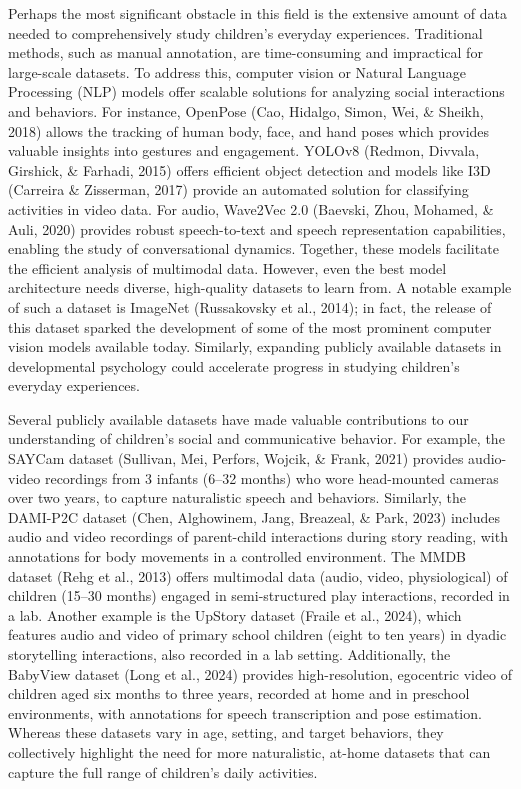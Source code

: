 \documentclass[
  man,floatsintext]{apa6}
\begin{document}
Perhaps the most significant obstacle in this field is the extensive amount of data needed to comprehensively study children's everyday experiences. Traditional methods, such as manual annotation, are time-consuming and impractical for large-scale datasets. To address this, computer vision or Natural Language Processing (NLP) models offer scalable solutions for analyzing social interactions and behaviors. For instance, OpenPose (Cao, Hidalgo, Simon, Wei, \& Sheikh, 2018) allows the tracking of human body, face, and hand poses which provides valuable insights into gestures and engagement. YOLOv8 (Redmon, Divvala, Girshick, \& Farhadi, 2015) offers efficient object detection and models like I3D (Carreira \& Zisserman, 2017) provide an automated solution for classifying activities in video data. For audio, Wave2Vec 2.0 (Baevski, Zhou, Mohamed, \& Auli, 2020) provides robust speech-to-text and speech representation capabilities, enabling the study of conversational dynamics. Together, these models facilitate the efficient analysis of multimodal data. However, even the best model architecture needs diverse, high-quality datasets to learn from. A notable example of such a dataset is ImageNet (Russakovsky et al., 2014); in fact, the release of this dataset sparked the development of some of the most prominent computer vision models available today. Similarly, expanding publicly available datasets in developmental psychology could accelerate progress in studying children's everyday experiences.

Several publicly available datasets have made valuable contributions to our understanding of children's social and communicative behavior. For example, the SAYCam dataset (Sullivan, Mei, Perfors, Wojcik, \& Frank, 2021) provides audio-video recordings from 3 infants (6--32 months) who wore head-mounted cameras over two years, to capture naturalistic speech and behaviors. Similarly, the DAMI-P2C dataset (Chen, Alghowinem, Jang, Breazeal, \& Park, 2023) includes audio and video recordings of parent-child interactions during story reading, with annotations for body movements in a controlled environment. The MMDB dataset (Rehg et al., 2013) offers multimodal data (audio, video, physiological) of children (15--30 months) engaged in semi-structured play interactions, recorded in a lab. Another example is the UpStory dataset (Fraile et al., 2024), which features audio and video of primary school children (eight to ten years) in dyadic storytelling interactions, also recorded in a lab setting. Additionally, the BabyView dataset (Long et al., 2024) provides high-resolution, egocentric video of children aged six months to three years, recorded at home and in preschool environments, with annotations for speech transcription and pose estimation. Whereas these datasets vary in age, setting, and target behaviors, they collectively highlight the need for more naturalistic, at-home datasets that can capture the full range of children's daily activities.
\end{document}
